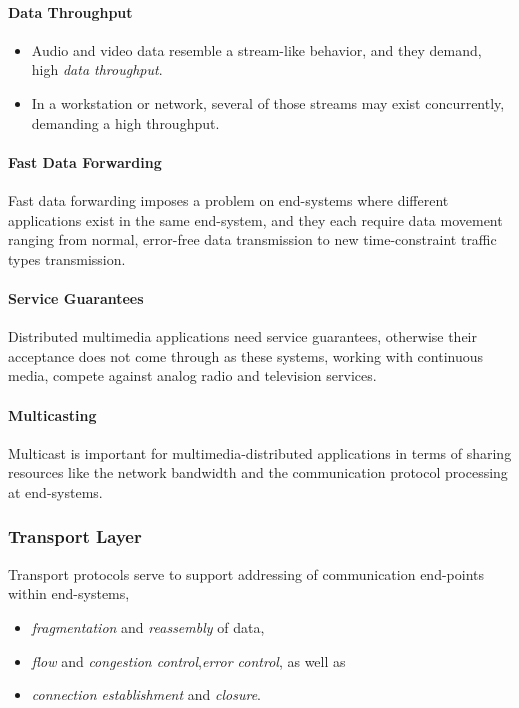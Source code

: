 \paragraph{Data Throughput}
\begin{itemize}
	\item Audio and video data resemble a stream-like behavior, and they demand, high \textit{data throughput}. 
	\item In a workstation or network, several of those streams may exist concurrently, demanding a high throughput.
\end{itemize}

\paragraph{{Fast Data Forwarding}}
Fast data forwarding imposes a problem on end-systems where different applications exist in the same end-system, and they each require data movement ranging from normal, error-free data transmission to new time-constraint traffic types transmission. 

\paragraph{{Service Guarantees}}
	Distributed multimedia applications need service guarantees, otherwise their acceptance does not come through as these systems, working with continuous media, compete against analog radio and television services.

\paragraph{{Multicasting}}
	Multicast is important for multimedia-distributed applications in terms of sharing resources like the network bandwidth and the communication protocol processing at end-systems. 



\subsubsection{Transport Layer}
Transport protocols serve to support addressing of communication end-points within end-systems, 
	\begin{itemize}
		\item \textit{fragmentation} and \textit{reassembly} of data, 
		\item \textit{flow} and \textit{congestion control},\textit{error control}, as well as 
		\item \textit{connection  establishment} and \textit{closure}.
	\end{itemize}



